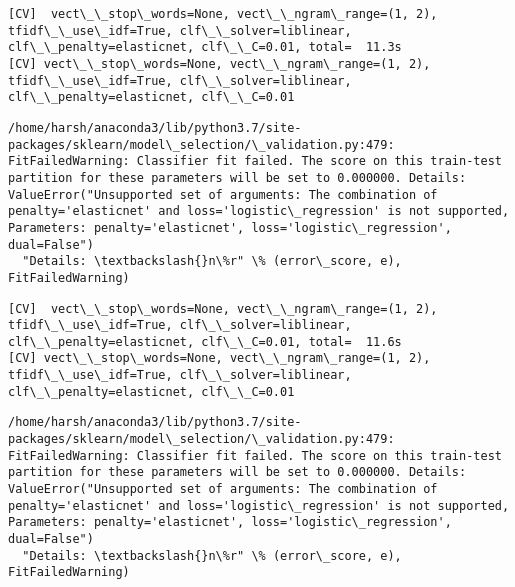 \documentclass[11pt]{article}
\begin{document}
    \begin{Verbatim}[commandchars=\\\{\}]
[CV]  vect\_\_stop\_words=None, vect\_\_ngram\_range=(1, 2), tfidf\_\_use\_idf=True, clf\_\_solver=liblinear, clf\_\_penalty=elasticnet, clf\_\_C=0.01, total=  11.3s
[CV] vect\_\_stop\_words=None, vect\_\_ngram\_range=(1, 2), tfidf\_\_use\_idf=True, clf\_\_solver=liblinear, clf\_\_penalty=elasticnet, clf\_\_C=0.01 

    \end{Verbatim}

    \begin{Verbatim}[commandchars=\\\{\}]
/home/harsh/anaconda3/lib/python3.7/site-packages/sklearn/model\_selection/\_validation.py:479: FitFailedWarning: Classifier fit failed. The score on this train-test partition for these parameters will be set to 0.000000. Details: 
ValueError("Unsupported set of arguments: The combination of penalty='elasticnet' and loss='logistic\_regression' is not supported, Parameters: penalty='elasticnet', loss='logistic\_regression', dual=False")
  "Details: \textbackslash{}n\%r" \% (error\_score, e), FitFailedWarning)

    \end{Verbatim}

    \begin{Verbatim}[commandchars=\\\{\}]
[CV]  vect\_\_stop\_words=None, vect\_\_ngram\_range=(1, 2), tfidf\_\_use\_idf=True, clf\_\_solver=liblinear, clf\_\_penalty=elasticnet, clf\_\_C=0.01, total=  11.6s
[CV] vect\_\_stop\_words=None, vect\_\_ngram\_range=(1, 2), tfidf\_\_use\_idf=True, clf\_\_solver=liblinear, clf\_\_penalty=elasticnet, clf\_\_C=0.01 

    \end{Verbatim}

    \begin{Verbatim}[commandchars=\\\{\}]
/home/harsh/anaconda3/lib/python3.7/site-packages/sklearn/model\_selection/\_validation.py:479: FitFailedWarning: Classifier fit failed. The score on this train-test partition for these parameters will be set to 0.000000. Details: 
ValueError("Unsupported set of arguments: The combination of penalty='elasticnet' and loss='logistic\_regression' is not supported, Parameters: penalty='elasticnet', loss='logistic\_regression', dual=False")
  "Details: \textbackslash{}n\%r" \% (error\_score, e), FitFailedWarning)

    \end{Verbatim}
\end{document}
